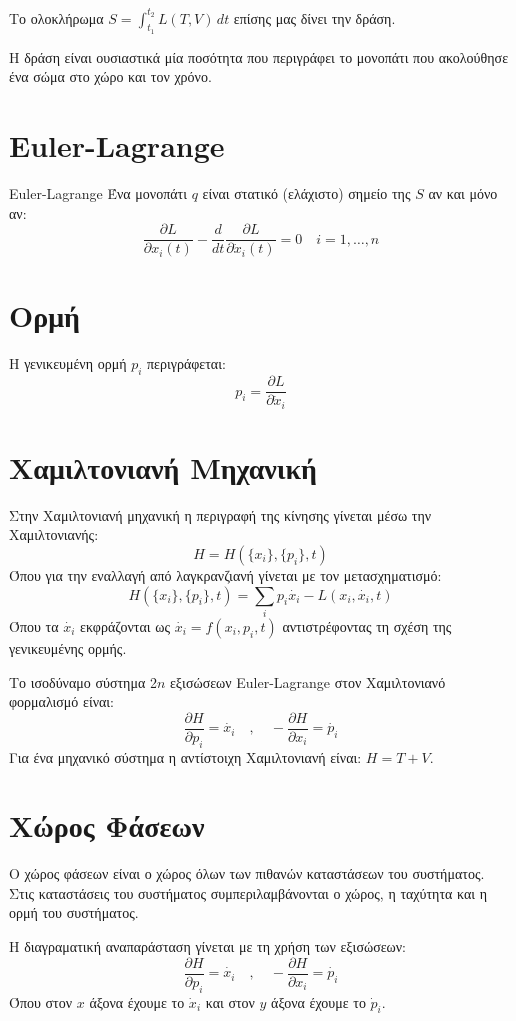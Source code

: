 \documentclass[11pt, oneside]{article}   	%
\begin{document}
Το ολοκλήρωμα $S = \int_{t_1}^{t_2} L(T,V) \, dt$ επίσης μας δίνει την δράση.

Η δράση είναι ουσιαστικά μία ποσότητα που περιγράφει το μονοπάτι που ακολούθησε ένα σώμα στο χώρο και τον χρόνο.

\section{Euler-Lagrange}
Euler-Lagrange
Ένα μονοπάτι $q$ είναι στατικό (ελάχιστο) σημείο της $S$ αν και μόνο αν:
\[\frac{\partial L}{\partial x_i(t)}- \frac{d}{dt}\frac{\partial L}{\partial \dot{x}_i(t)} = 0 \quad i=1,\dots,n\]

\section{Ορμή}

Η γενικευμένη ορμή $p_i$ περιγράφεται:
\[p_i = \frac{\partial L}{\partial \dot{x}_i}\]

\section{Χαμιλτονιανή Μηχανική}
Στην Χαμιλτονιανή μηχανική η περιγραφή της κίνησης γίνεται μέσω την Χαμιλτονιανής:
\[H = H(\{x_i\},\{p_i\},t)\]
Όπου για την εναλλαγή από λαγκρανζιανή γίνεται με τον μετασχηματισμό:
\[H(\{x_i\},\{p_i\},t) = \sum_i p_i \dot{x_i} - L(x_i,\dot{x_i},t)\]
Όπου τα $\dot{x_i}$ εκφράζονται ως $\dot{x_i} = f(x_i,p_i,t)$ αντιστρέφοντας τη σχέση της γενικευμένης ορμής.

Το ισοδύναμο σύστημα 2$n$ εξισώσεων Euler-Lagrange στον Χαμιλτονιανό φορμαλισμό είναι:
\[\frac{\partial H}{\partial p_i}=\dot{x_i} \quad , \quad -\frac{\partial H}{\partial x_i} = \dot{p_i}\]
Για ένα μηχανικό σύστημα η αντίστοιχη Χαμιλτονιανή είναι: $H = T+V$.

\section{Χώρος Φάσεων}
Ο χώρος φάσεων είναι ο χώρος όλων των πιθανών καταστάσεων του συστήματος. Στις καταστάσεις του συστήματος συμπεριλαμβάνονται ο χώρος, η ταχύτητα και η ορμή του συστήματος.

Η διαγραματική αναπαράσταση γίνεται με τη χρήση των εξισώσεων:
\[\frac{\partial H}{\partial p_i}=\dot{x_i} \quad , \quad -\frac{\partial H}{\partial x_i} = \dot{p_i}\]
Όπου στον $x$ άξονα έχουμε το $\dot{x}_i$ και στον $y$ άξονα έχουμε το $\dot{p}_i$.
\end{document}
